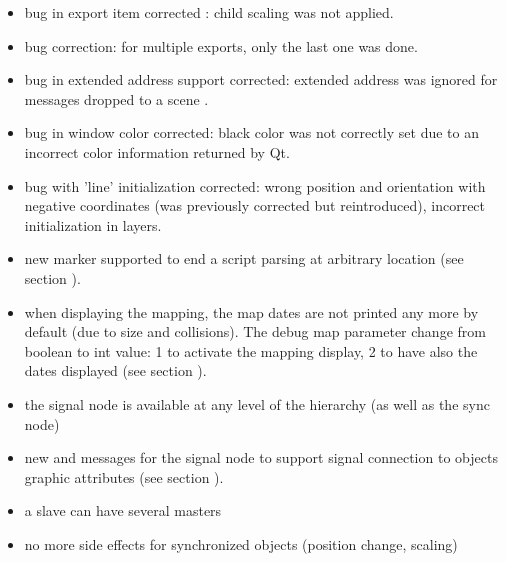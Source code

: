 \begin{itemize}
\item bug in export item corrected : child scaling was not applied.
\item bug correction: for multiple exports, only the last one was done.
\item bug in extended address support corrected: extended address was ignored for messages dropped to a scene .
\item bug in window color corrected: black color was not correctly set due to an incorrect color 
  information returned by Qt.
\item bug with 'line' initialization corrected: wrong position and orientation with negative coordinates (was previously corrected but reintroduced), incorrect initialization in layers.

\end{itemize}

\begin{itemize}
\item  new  marker supported to end a script parsing at arbitrary location  (see section ).
\item  when displaying the mapping, the map dates are not printed any more by default (due to size and collisions).  The debug map parameter change from boolean to int value: 1 to activate the mapping display, 
2 to have also the dates displayed  (see section ).
\item the signal node is available at any level of the hierarchy (as well as the sync node)
\item new  and  messages for the signal node to support signal connection to objects graphic attributes (see section ).
\item a slave can have several masters
\item no more side effects for synchronized objects (position change, scaling)
\end{itemize}

